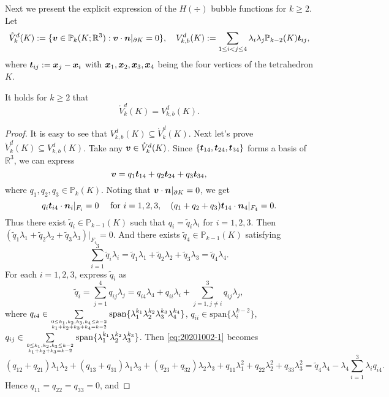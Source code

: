 Next we present the explicit expression of the $H(\div)$ bubble functions for $k\geq2$. Let
\[
\mathring V_{k}^d(K):=\{\boldsymbol v\in\mathbb P_{k}(K;\mathbb R^3): \boldsymbol v\cdot\boldsymbol n|_{\partial K}=0\},\quad
V_{k,b}^d(K):=\sum_{1\leq i<j\leq 4}\lambda_i\lambda_j\mathbb P_{k-2}(K)\boldsymbol t_{ij},
\]
where $\boldsymbol t_{ij}:=\boldsymbol x_j-\boldsymbol x_i$ with $\boldsymbol x_1, \boldsymbol x_2, \boldsymbol x_3, \boldsymbol x_4$ being the four vertices of the tetrahedron $K$.
\begin{lemma}
It holds for $k\geq2$ that
\begin{equation}\label{eq:Hdivbubbleidentity}
\mathring V_{k}^d(K)=V_{k,b}^d(K).
\end{equation}
\end{lemma}
\begin{proof}
It is easy to see that $V_{k,b}^d(K)\subseteq\mathring V_{k}^d(K)$. Next let's prove $\mathring V_{k}^d(K)\subseteq V_{k,b}^d(K)$. Take any $\boldsymbol v\in\mathring V_{k}^d(K)$. Since $\{\boldsymbol t_{14}, \boldsymbol t_{24}, \boldsymbol t_{34}\}$ forms a basis of $\mathbb R^3$, we can express 
$$\boldsymbol v=q_1\boldsymbol t_{14}+q_2\boldsymbol t_{24}+q_3\boldsymbol t_{34},$$ 
where $q_1, q_2, q_3\in\mathbb P_k(K)$. Noting that $\boldsymbol v\cdot\boldsymbol n|_{\partial K}=0$, we get
\[
q_i\boldsymbol t_{i4}\cdot\boldsymbol n_i|_{F_i}=0\quad\textrm{ for } i=1,2,3,
\quad
(q_1+q_2+q_3)\boldsymbol t_{14}\cdot\boldsymbol n_4|_{F_4}=0.
\]
Thus there exist $\tilde q_i\in\mathbb P_{k-1}(K)$ such that $q_i=\tilde q_i\lambda_i$ for $i=1,2,3$. Then $(\tilde q_1\lambda_1+\tilde q_2\lambda_2+\tilde q_3\lambda_3)|_{F_4}=0$. And there exists $\tilde q_4\in\mathbb P_{k-1}(K)$ satisfying
\begin{equation}\label{eq:20201002-1}
\sum_{i=1}^3\tilde q_i\lambda_i = \tilde q_1\lambda_1+\tilde q_2\lambda_2+\tilde q_3\lambda_3=\tilde q_4\lambda_4.
\end{equation}
For each $i=1,2,3$, express $\tilde q_i$ as
\[
\tilde q_i=\sum_{j=1}^4q_{ij}\lambda_j=q_{i4}\lambda_4+q_{ii}\lambda_i+\sum_{j=1, j\neq i}^3q_{ij}\lambda_j,
\]
where $q_{i4}\in\sum\limits_{0\leq k_1,k_2,k_3,k_4\leq k-2
\atop k_1+k_2+k_3+k_4=k-2}\textrm{span}\{\lambda_1^{k_1}\lambda_2^{k_2}\lambda_3^{k_3}\lambda_4^{k_4}\}$, $q_{ii}\in\textrm{span}\{\lambda_i^{k-2}\}$, $q_{ij}\in\sum\limits_{0\leq k_1,k_2,k_3\leq k-2
\atop k_1+k_2+k_3=k-2}\textrm{span}\{\lambda_1^{k_1}\lambda_2^{k_2}\lambda_3^{k_3}\}$.
Then \eqref{eq:20201002-1} becomes
\[
(q_{12}+q_{21})\lambda_1\lambda_2+(q_{13}+q_{31})\lambda_1\lambda_3+(q_{23}+q_{32})\lambda_2\lambda_3
+ q_{11}\lambda_1^2+ q_{22}\lambda_2^2 + q_{33}\lambda_3^2=\tilde q_4\lambda_4-\lambda_4\sum_{i=1}^3\lambda_iq_{i4}.
\]
Hence $q_{11}=q_{22}=q_{33}=0$, and

\end{proof}
